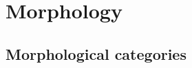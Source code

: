 \chapter{Morphology}
\label{chp:morphology}
\minitoc\mtcskip
\section{Morphological categories}
\label{sect:Morphological categories}

